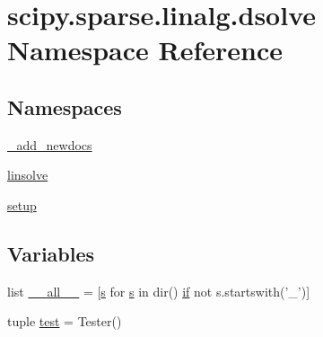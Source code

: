 \hypertarget{namespacescipy_1_1sparse_1_1linalg_1_1dsolve}{}\section{scipy.\+sparse.\+linalg.\+dsolve Namespace Reference}
\label{namespacescipy_1_1sparse_1_1linalg_1_1dsolve}
\subsection*{Namespaces}
\begin{DoxyCompactItemize}
\item 
 \hyperlink{namespacescipy_1_1sparse_1_1linalg_1_1dsolve_1_1__add__newdocs}{\+\_\+add\+\_\+newdocs}
\item 
 \hyperlink{namespacescipy_1_1sparse_1_1linalg_1_1dsolve_1_1linsolve}{linsolve}
\item 
 \hyperlink{namespacescipy_1_1sparse_1_1linalg_1_1dsolve_1_1setup}{setup}
\end{DoxyCompactItemize}
\subsection*{Variables}
\begin{DoxyCompactItemize}
\item 
list \hyperlink{namespacescipy_1_1sparse_1_1linalg_1_1dsolve_ac7dd37dd0830e4f58008ecb5f4eac711}{\+\_\+\+\_\+all\+\_\+\+\_\+} = \mbox{[}\hyperlink{indexexpr_8h_ae024b0db549122b44c349ae28ec990dc}{s} for \hyperlink{indexexpr_8h_ae024b0db549122b44c349ae28ec990dc}{s} in dir() \hyperlink{minmax_8h_a30a0ee9fee303f01d9c5e6f669e0dfe9}{if} not s.\+startswith('\+\_\+')\mbox{]}
\item 
tuple \hyperlink{namespacescipy_1_1sparse_1_1linalg_1_1dsolve_a475f1f29c3c7fabbfd47640fe5db8e08}{test} = Tester()
\end{DoxyCompactItemize}


